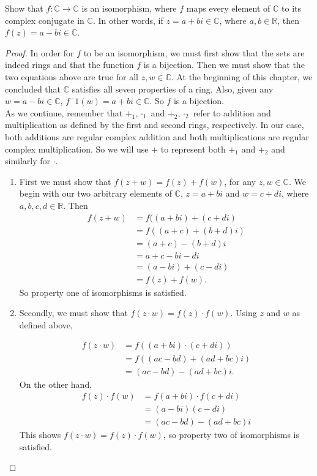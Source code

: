 \begin{example}\label{example:rings:conjugate}
Show that $f:{\mathbb C}\rightarrow{\mathbb C}$ is an isomorphism, where $f$ maps every element of ${\mathbb C}$ to its complex conjugate in ${\mathbb C}$.  In other words, if $z=a+bi\in{\mathbb C}$, where $a,b\in{\mathbb R}$, then $f(z)=a-bi\in{\mathbb C}$.

\begin{proof}{}
In order for $f$ to be an isomorphism, we must first show that the sets are indeed rings and that the function $f$ is a bijection.  Then we must show that the two equations above are true for all $z,w\in{\mathbb C}$.  At the beginning of this chapter, we concluded that ${\mathbb C}$ satisfies all seven properties of a ring.  Also, given any $w=a-bi\in{\mathbb C}$, $f^-1(w)=a+bi\in{\mathbb C}$.  So $f$ is a bijection.\\  
As we continue, remember that $+_1, \cdot_1$ and $+_2, \cdot_2$ refer to addition and multiplication as defined by the first and second rings, respectively.  In our case, both additions are regular complex addition and both multiplications are regular complex multiplication.  So we will use $+$ to represent both $+_1$ and $+_2$ and similarly for $\cdot$.
\begin{enumerate}[(1)]
\item First we must show that $f(z+w)=f(z)+f(w)$, for any $z,w\in{\mathbb C}$.  We begin with our two arbitrary elements of ${\mathbb C}$, $z=a+bi$ and $w=c+di$, where $a,b,c,d\in{\mathbb R}$.  Then 
\begin{align*}
f(z+w)&=f((a+bi)+(c+di)\\
&=f((a+c)+(b+d)i)\\
&=(a+c)-(b+d)i\\
&=a+c-bi-di\\
&=(a-bi)+(c-di)\\
&=f(z)+f(w).
\end{align*}
So property one of isomorphisms is satisfied.
\item Secondly, we must show that $f(z\cdot w)=f(z)\cdot f(w)$.  Using $z$ and $w$ as defined above,

\begin{align*}
  f(z\cdot w)&=f((a+bi)\cdot(c+di))\\
  &=f((ac-bd)+(ad+bc)i)\\
  &=(ac-bd)-(ad+bc)i.
\end{align*}
On the other hand,
\begin{align*}
f(z)\cdot f(w)&=f(a+bi)\cdot f(c+di)\\
&=(a-bi)(c-di)\\
&=(ac-bd)-(ad+bc)i
\end{align*}
This shows $f(z\cdot w)=f(z)\cdot f(w)$, so property two of isomorphisms is satisfied.
\end{enumerate}
\end{proof}
\end{example}

